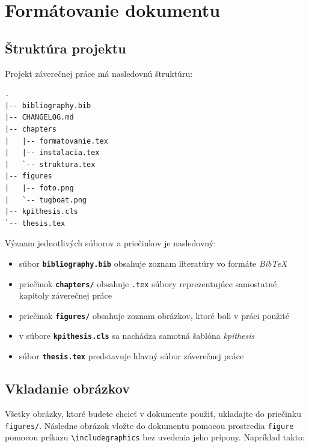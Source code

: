 \chapter{Formátovanie dokumentu}

\section{Štruktúra projektu}

Projekt záverečnej práce má nasledovnú štruktúru:

\begin{verbatim}
.
|-- bibliography.bib
|-- CHANGELOG.md
|-- chapters
|   |-- formatovanie.tex
|   |-- instalacia.tex
|   `-- struktura.tex
|-- figures
|   |-- foto.png
|   `-- tugboat.png
|-- kpithesis.cls
`-- thesis.tex
\end{verbatim}

Význam jednotlivých súborov a priečinkov je nasledovný:

\begin{itemize}
    \item súbor {\tt \bf{bibliography.bib}} obsahuje zoznam literatúry vo formáte \emph{BibTeX}
    \item priečinok {\tt \bf{chapters/}} obsahuje {\tt .tex} súbory reprezentujúce samostatné kapitoly záverečnej práce
    \item priečinok {\tt \bf{figures/}} obsahuje zoznam obrázkov, ktoré boli v práci použité
    \item v súbore {\tt \bf{kpithesis.cls}} sa nachádza samotná šablóna \emph{kpithesis}
    \item súbor {\tt \bf{thesis.tex}} predstavuje hlavný súbor záverečnej práce
\end{itemize}


\section{Vkladanie obrázkov}

Všetky obrázky, ktoré budete chcieť v dokumente použiť, ukladajte do priečinku {\tt figures/}. Následne obrázok vložte do dokumentu pomocou prostredia \verb!figure! pomocou príkazu \verb!\includegraphics! bez uvedenia jeho prípony. Napríklad takto:

